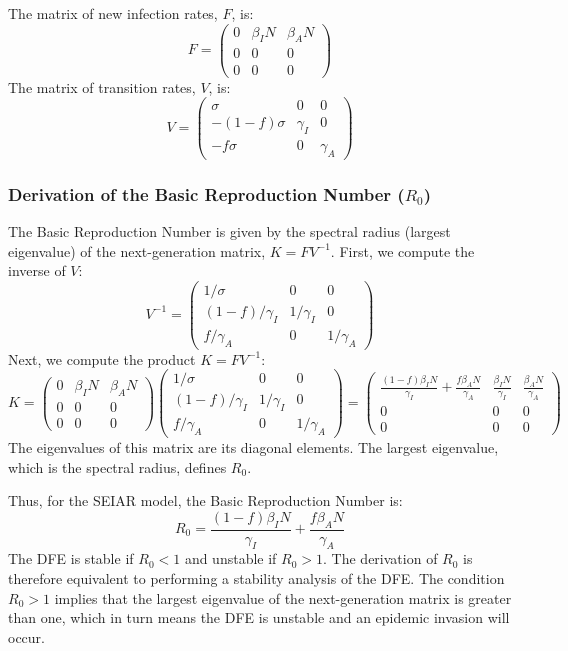 \documentclass[12pt, a4paper]{article}
\begin{document}
The matrix of new infection rates, $F$, is:
\[
F = \begin{pmatrix}
0 & \beta_I N & \beta_A N \\
0 & 0 & 0 \\
0 & 0 & 0
\end{pmatrix}
\]
The matrix of transition rates, $V$, is:
\[
V = \begin{pmatrix}
\sigma & 0 & 0 \\
-(1-f)\sigma & \gamma_I & 0 \\
-f\sigma & 0 & \gamma_A
\end{pmatrix}
\]

\subsubsection{Derivation of the Basic Reproduction Number ($R_0$)}
The Basic Reproduction Number is given by the spectral radius (largest eigenvalue) of the next-generation matrix, $K = FV^{-1}$. First, we compute the inverse of $V$:
\[
V^{-1} = \begin{pmatrix}
1/\sigma & 0 & 0 \\
(1-f)/\gamma_I & 1/\gamma_I & 0 \\
f/\gamma_A & 0 & 1/\gamma_A
\end{pmatrix}
\]
Next, we compute the product $K = FV^{-1}$:
\[
K = 
\begin{pmatrix}
0 & \beta_I N & \beta_A N \\
0 & 0 & 0 \\
0 & 0 & 0
\end{pmatrix}
\begin{pmatrix}
1/\sigma & 0 & 0 \\
(1-f)/\gamma_I & 1/\gamma_I & 0 \\
f/\gamma_A & 0 & 1/\gamma_A
\end{pmatrix}
=
\begin{pmatrix}
 \frac{(1-f)\beta_I N}{\gamma_I} + \frac{f\beta_A N}{\gamma_A} & \frac{\beta_I N}{\gamma_I} & \frac{\beta_A N}{\gamma_A} \\
 0 & 0 & 0 \\
 0 & 0 & 0
\end{pmatrix}
\]
The eigenvalues of this matrix are its diagonal elements. The largest eigenvalue, which is the spectral radius, defines $R_0$.

Thus, for the SEIAR model, the Basic Reproduction Number is:
\[
R_0 = \frac{(1-f)\beta_I N}{\gamma_I} + \frac{f\beta_A N}{\gamma_A}
\]
The DFE is stable if $R_0 < 1$ and unstable if $R_0 > 1$. The derivation of $R_0$ is therefore equivalent to performing a stability analysis of the DFE. The condition $R_0 > 1$ implies that the largest eigenvalue of the next-generation matrix is greater than one, which in turn means the DFE is unstable and an epidemic invasion will occur.
\end{document}
